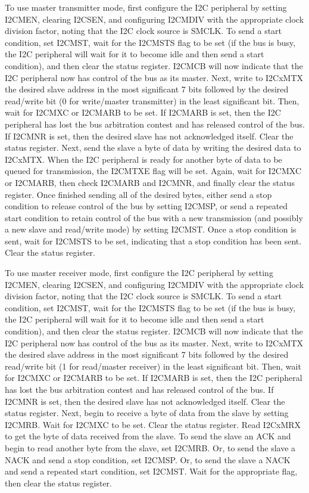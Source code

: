 To use master transmitter mode, first configure the I2C peripheral by setting I2CMEN, clearing I2CSEN, and configuring I2CMDIV with the appropriate clock division factor, noting that the I2C clock source is SMCLK. To send a start condition, set I2CMST, wait for the I2CMSTS flag to be set (if the bus is busy, the I2C peripheral will wait for it to become idle and then send a start condition), and then clear the status register. I2CMCB will now indicate that the I2C peripheral now has control of the bus as its master. Next, write to I2CxMTX the desired slave address in the most significant 7 bits followed by the desired read/write bit (0 for write/master transmitter) in the least significant bit. Then, wait for I2CMXC or I2CMARB to be set. If I2CMARB is set, then the I2C peripheral has lost the bus arbitration contest and has released control of the bus. If I2CMNR is set, then the desired slave has not acknowledged itself. Clear the status register. Next, send the slave a byte of data by writing the desired data to I2CxMTX. When the I2C peripheral is ready for another byte of data to be queued for transmission, the I2CMTXE flag will be set. Again, wait for I2CMXC or I2CMARB, then check I2CMARB and I2CMNR, and finally clear the status register. Once finished sending all of the desired bytes, either send a stop condition to release control of the bus by setting I2CMSP, or send a repeated start condition to retain control of the bus with a new transmission (and possibly a new slave and read/write mode) by setting I2CMST. Once a stop condition is sent, wait for I2CMSTS to be set, indicating that a stop condition has been sent. Clear the status register.

To use master receiver mode, first configure the I2C peripheral by setting I2CMEN, clearing I2CSEN, and configuring I2CMDIV with the appropriate clock division factor, noting that the I2C clock source is SMCLK. To send a start condition, set I2CMST, wait for the I2CMSTS flag to be set (if the bus is busy, the I2C peripheral will wait for it to become idle and then send a start condition), and then clear the status register. I2CMCB will now indicate that the I2C peripheral now has control of the bus as its master. Next, write to I2CxMTX the desired slave address in the most significant 7 bits followed by the desired read/write bit (1 for read/master receiver) in the least significant bit. Then, wait for I2CMXC or I2CMARB to be set. If I2CMARB is set, then the I2C peripheral has lost the bus arbitration contest and has released control of the bus. If I2CMNR is set, then the desired slave has not acknowledged itself. Clear the status register. Next, begin to receive a byte of data from the slave by setting I2CMRB. Wait for I2CMXC to be set. Clear the status register. Read I2CxMRX to get the byte of data received from the slave. To send the slave an ACK and begin to read another byte from the slave, set I2CMRB. Or, to send the slave a NACK and send a stop condition, set I2CMSP. Or, to send the slave a NACK and send a repeated start condition, set I2CMST. Wait for the appropriate flag, then clear the status register.

